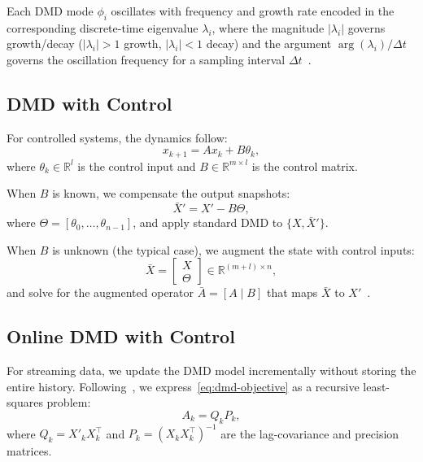 \documentclass[conference]{IEEEtran}
\begin{document}
Each DMD mode \(\phi_i\) oscillates with frequency and growth rate encoded in the corresponding discrete-time eigenvalue \(\lambda_i\), where the magnitude \(|\lambda_i|\) governs growth/decay (\(|\lambda_i|>1\) growth, \(|\lambda_i|<1\) decay) and the argument \(\arg(\lambda_i)/\Delta t\) governs the oscillation frequency for a sampling interval \(\Delta t\)~\cite{Brunton2022}.

\subsection{DMD with Control}

For controlled systems, the dynamics follow:
\begin{equation}\label{eq:controlled-system}
    x_{k+1} = Ax_k + B\theta_k,
\end{equation}
where \(\theta_k \in \mathbb{R}^l\) is the control input and \(B \in \mathbb{R}^{m \times l}\) is the control matrix.

When \(B\) is known, we compensate the output snapshots:
\begin{equation}
    \bar{X}' = X' - B\Theta,
\end{equation}
where \(\Theta = [\theta_0, \ldots, \theta_{n-1}]\), and apply standard DMD to \(\{X, \bar{X}'\}\).

When \(B\) is unknown (the typical case), we augment the state with control inputs:
\begin{equation}\label{eq:augmented}
    \bar{X} = \begin{bmatrix} X \\ \Theta \end{bmatrix} \in \mathbb{R}^{(m+l) \times n},
\end{equation}
and solve for the augmented operator \(\bar{A} = [A \mid B]\) that maps \(\bar{X}\) to \(X'\)~\cite{Proctor2016}.

\subsection{Online DMD with Control}

For streaming data, we update the DMD model incrementally without storing the entire history. Following~\cite{Zhang2019}, we express~\eqref{eq:dmd-objective} as a recursive least-squares problem:
\begin{equation}
    A_k = Q_k P_k,
\end{equation}
where \(Q_k = X'_k X_k^\top\) and \(P_k = (X_k X_k^\top)^{-1}\) are the lag-covariance and precision matrices.
\end{document}
